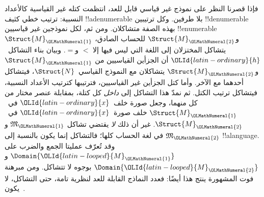 \documentclass[../../../include/open-logic-section]{subfiles}
\begin{document}
\begin{explain}
فإذا قصرنا النظر على نموذج غير قياسي قابل للعد، انتظمت
كتله غير القياسية كالأعداد النسبية: ترتيب خطي كثيف
!!a{denumerable} بلا طرفين. وكل ترتيبين !!{denumerable}
بهذه الصفة متشاكلان. ومن ثم، لكل نموذجين غير قياسيين
!!{enumerable}~$\Struct{M}_{\OLMathNumeral{1}}$ و$\Struct{M}_{\OLMathNumeral{2}}$ للحساب الصادق،
يتشاكل المختزلان إلى اللغة التي ليس فيها إلا $<$ و$=$.
وبيان بناء التشاكل~${\OLId{latin-ordinary}{h}}$ أن الجزأين القياسيين من $\Struct{M}_{\OLMathNumeral{1}}$
و$\Struct{M}_{\OLMathNumeral{2}}$ يتشاكلان مع النموذج القياسي~$\Struct{N}$،
فيتشاكل أحدهما مع الآخر. وأما كتل الجزأين غير القياسيين،
فترتيبها كترتيب الأعداد النسبية، فيتشاكل ترتيب الكتل.
ثم نمدّ هذا التشاكل إلى \emph{داخل} كل كتلة، بمقابلة
عنصر مختار من كل منهما، وجعل صورة خلف~${\OLId{latin-ordinary}{x}}$
في~$\Struct{M}_{\OLMathNumeral{1}}$ خلف صورة~${\OLId{latin-ordinary}{x}}$ في~$\Struct{M}_{\OLMathNumeral{2}}$.
غير أن ذلك \emph{لا} يقتضي تشاكل $\mathfrak{M}_{\OLMathNumeral{1}}$
و$\mathfrak{M}_{\OLMathNumeral{2}}$ في لغة الحساب كلها؛ فالتشاكل إنما يكون
بالنسبة إلى !!a{language}. وقد تُعرّف عمليتا الجمع والضرب
على $\Domain{{\OLId{latin-looped}{M}}_{\OLMathNumeral{1}}}$ و$\Domain{{\OLId{latin-looped}{M}}_{\OLMathNumeral{2}}}$ بوجوه لا تتشاكل.
ومن مبرهنة فوت المشهورة ينتج هذا أيضًا: فعدد النماذج
القابلة للعد لنظرية تامة، حتى التشاكل، لا يكون~.
\end{explain}
\end{document}
